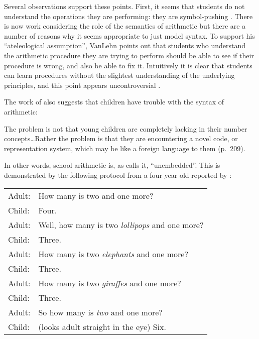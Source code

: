Several observations support these points. First, it seems that students
do not understand the operations they are performing: they are
symbol-pushing \cite[pp.~38--40]{mindbugs}.  There is now work
considering the role of the semantics of arithmetic
\cite{hennwhy,paynalge,ohlsfunc} but there are a number of reasons why
it seems appropriate to just model syntax. To support his
``ateleological assumption'', VanLehn points out that students who
understand the arithmetic procedure they are trying to perform should be
able to see if their procedure is wrong, and also be able to fix it.
Intuitively it is clear that students can learn procedures without the
slightest understanding of the underlying principles, and this point
appears uncontroversial \cite[p.~38]{mindbugs}.



The work of  also suggests that children have trouble with
the syntax of arithmetic:
\begin{ssquote}
The problem is not that young children are completely lacking in their
number concepts\ldots Rather the problem is that they are encountering a
novel code, or representation system, which may be like a foreign language
to them (p.~209).
\end{ssquote}

In other words, school
arithmetic is, as  calls it, ``unembedded''.  This
is demonstrated by the following protocol from a
four year old reported by :

\begin{sstabular}
\begin{tabular}{ll}\\
Adult: &How many is two and one more?\\
Child: &Four.\\
Adult: &Well, how many is two {\em lollipops} and one more?\\
Child: &Three.\\
Adult: &How many is two {\em elephants} and one more?\\
Child: &Three.\\
Adult: &How many is two {\em giraffes} and one more?\\
Child: &Three.\\
Adult: &So how many is {\em two} and one more?\\
Child: &(looks adult straight in the eye) Six.
\end{tabular}
\end{sstabular}
\spaceafterquote

